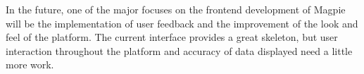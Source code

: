 In the future, one of the major focuses on the frontend development of Magpie will be the implementation of user feedback and the improvement of the look and feel of the platform. The current interface provides a great skeleton, but user interaction throughout the platform and accuracy of data displayed need a little more work.


